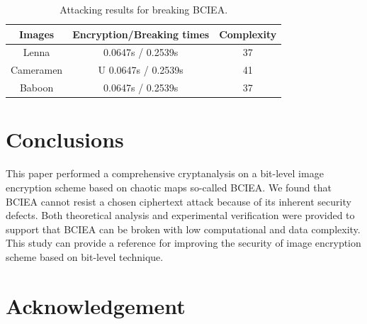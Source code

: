 \documentclass[final,3p,times,twocolumn]{elsarticle}
\begin{document}
%

\begin{table}[!htb]
	\label{tab:exp_result}
	\caption{Attacking results for breaking BCIEA.}
	\centering
	\begin{tabular}{ccc}
		\hline
		\textbf{Images}  & \textbf{Encryption/Breaking times} & \textbf{Complexity} \\
		\hline 
		Lenna & 0.0647s / 0.2539s  & 37  \\ 
		Cameramen & U 0.0647s / 0.2539s  & 41  \\  
		Baboon& 0.0647s / 0.2539s  & 37  \\ 
		\hline
	\end{tabular}
	\label{tab:exp_results}
\end{table}



\section{Conclusions}


This paper performed a comprehensive cryptanalysis on a bit-level image encryption scheme based on chaotic maps so-called BCIEA. We found that BCIEA cannot resist a chosen ciphertext attack because of its inherent security defects. Both theoretical analysis and experimental verification were provided to support that BCIEA can be broken with low computational and data complexity. This study can provide a reference for improving the security of image encryption scheme based on bit-level technique.


\cite{Shafique2018epjp,MPEanalysis2015infsci,Diaconu2015infsci,Stinson2006,fengw2018ieeepj,wenh2019epjp,zhuzl2011infsci,Lcq:Optimal:SP11,Jolfaei2016TransIFS,Uhl2018Trans,YE2010PRL,fridrich1998symmetric,lic2016sigpro,ozkaynak:review:ND18,shannon1949communication,tengl2017MTA}

\section*{Acknowledgement}




\end{document}
